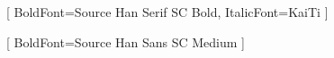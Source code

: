 \usepackage[fontset=none]{ctex}

[
    BoldFont={Source Han Serif SC Bold},
    ItalicFont={KaiTi}
]

[
    BoldFont={Source Han Sans SC Medium}
]


